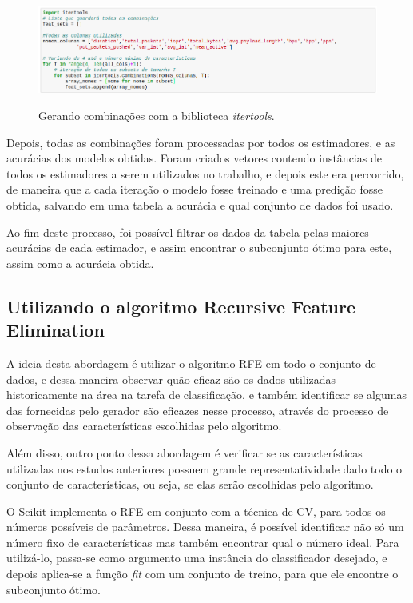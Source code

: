 \begin{figure}[h]
\caption{\small Gerando combinações com a biblioteca \textit{itertools}.}
\centering
\includegraphics[scale=0.40]{figs/exemplo-itertools.png}
\label{f.exemplo-itertools}
\end{figure}

Depois, todas as combinações foram processadas por todos os estimadores, e as acurácias dos modelos obtidas. Foram criados vetores contendo instâncias de todos os estimadores a serem utilizados no trabalho, e depois este era percorrido, de maneira que a cada iteração o modelo fosse treinado e uma predição fosse obtida, salvando em uma tabela a acurácia e qual conjunto de dados foi usado.

Ao fim deste processo, foi possível filtrar os dados da tabela pelas maiores acurácias de cada estimador, e assim encontrar o subconjunto ótimo para este, assim como a acurácia obtida.

\subsection{Utilizando o algoritmo Recursive Feature Elimination}
\label{ss.dados-rfe}

A ideia desta abordagem é utilizar o algoritmo RFE em todo o conjunto de dados, e dessa maneira observar quão eficaz são os dados utilizadas historicamente na área na tarefa de classificação, e também identificar se algumas das fornecidas pelo gerador são eficazes nesse processo, através do processo de observação das características escolhidas pelo algoritmo. 

Além disso, outro ponto dessa abordagem é verificar se as características utilizadas nos estudos anteriores possuem grande representatividade dado todo o conjunto de características, ou seja, se elas serão escolhidas pelo algoritmo.

O Scikit implementa o RFE em conjunto com a técnica de CV, para todos os números possíveis de parâmetros. Dessa maneira, é possível identificar não só um número fixo de características mas também encontrar qual o número ideal. Para utilizá-lo, passa-se como argumento uma instância do classificador desejado, e depois aplica-se a função \textit{fit} com um conjunto de treino, para que ele encontre o subconjunto ótimo.

